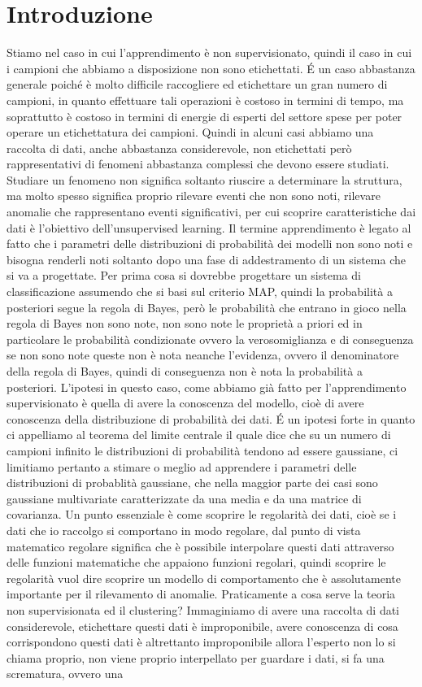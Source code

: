 \section{Introduzione}
Stiamo nel caso in cui l'apprendimento è non supervisionato, quindi il caso in cui i campioni che abbiamo a disposizione non sono etichettati. \'E un caso abbastanza generale poiché è molto difficile raccogliere ed etichettare un gran numero di campioni, in quanto effettuare tali operazioni è costoso in termini di tempo, ma soprattutto è costoso in termini di energie di esperti del settore spese per poter operare un etichettatura dei campioni. Quindi in alcuni casi abbiamo una raccolta di dati, anche abbastanza considerevole, non etichettati però rappresentativi di fenomeni abbastanza complessi che devono essere studiati. Studiare un fenomeno non significa soltanto riuscire a determinare la struttura, ma molto spesso significa proprio rilevare eventi che non sono noti, rilevare anomalie che rappresentano eventi significativi, per cui scoprire caratteristiche dai dati è l'obiettivo dell'unsupervised learning. Il termine apprendimento è legato al fatto che i parametri delle distribuzioni di probabilità dei modelli non sono noti e bisogna renderli noti soltanto dopo una fase di addestramento di un sistema che si va a progettate. Per prima cosa si dovrebbe progettare un sistema di classificazione assumendo che si basi sul criterio MAP, quindi la probabilità a posteriori segue la regola di Bayes, però le probabilità che entrano in gioco nella regola di Bayes non sono note, non sono note le proprietà a priori ed in particolare le probabilità condizionate ovvero la verosomiglianza e di conseguenza se non sono note queste non è nota neanche l'evidenza, ovvero il denominatore della regola di Bayes, quindi di conseguenza non è nota la probabilità a posteriori. L'ipotesi in questo caso, come abbiamo già fatto per l'apprendimento supervisionato è quella di avere la conoscenza del modello, cioè di avere conoscenza della distribuzione di probabilità dei dati. \'E un ipotesi forte in quanto ci appelliamo al teorema del limite centrale il quale dice che su un numero di campioni infinito le distribuzioni di probabilità tendono ad essere gaussiane, ci limitiamo pertanto a stimare o meglio ad apprendere i parametri delle distribuzioni di probablità gaussiane, che  nella maggior parte dei casi sono gaussiane multivariate caratterizzate da una media e da una matrice di covarianza. Un punto essenziale è come scoprire le regolarità dei dati, cioè se i dati che io raccolgo si comportano in modo regolare, dal punto di vista matematico regolare significa che è possibile interpolare questi dati attraverso delle funzioni matematiche che appaiono funzioni regolari, quindi scoprire le regolarità vuol dire scoprire un modello di comportamento che è assolutamente importante per il rilevamento di anomalie. Praticamente a cosa serve la teoria non supervisionata ed il clustering? Immaginiamo di avere una raccolta di dati considerevole, etichettare questi dati è improponibile, avere conoscenza di cosa corrispondono questi dati è altrettanto improponibile allora l'esperto non lo si chiama proprio, non viene proprio interpellato per guardare i dati, si fa una scrematura, ovvero una 